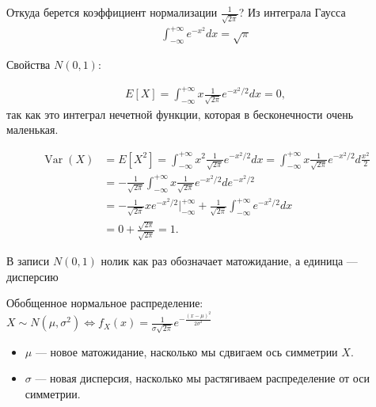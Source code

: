 \documentclass[12pt]{article}
\DeclareMathOperator{\Var}{Var}
\begin{document}
  Откуда берется коэффициент нормализации $\frac{1}{\sqrt{2\pi}}$? Из интеграла Гаусса
  \begin{align*}
    \int_{-\infty}^{+\infty} e^{-x^2} dx = \sqrt{\pi}
  \end{align*}

  Свойства $N(0, 1)$:

  \begin{align*}
    E[X] = \int_{-\infty}^{+\infty} x \frac{1}{\sqrt{2\pi}}e^{-x^2/2} dx = 0,
  \end{align*}
  так как это интеграл нечетной функции, которая в бесконечности очень маленькая.

  \begin{align*}
    \Var(X) &= E[X^2] = \int_{-\infty}^{+\infty} x^2 \frac{1}{\sqrt{2\pi}}e^{-x^2/2} dx = \int_{-\infty}^{+\infty} x \frac{1}{\sqrt{2\pi}}e^{-x^2/2}d\frac{x^2}{2} \\
            &= - \frac{1}{\sqrt{2\pi}} \int_{-\infty}^{+\infty} x \frac{1}{\sqrt{2\pi}}e^{-x^2/2}de^{-x^2/2} \\
            &= - \frac{1}{\sqrt{2\pi}} x e^{-x^2/2} \bigg|_{-\infty}^{+\infty} + \frac{1}{\sqrt{2\pi}} \int_{-\infty}^{+\infty} e^{-x^2/2} dx \\
            &= 0 + \frac{\sqrt{2\pi}}{\sqrt{2\pi}} = 1.
  \end{align*}

  В записи $N(0, 1)$ нолик как раз обозначает матожидание, а единица --- дисперсию

  Обобщенное нормальное распределение: $X \sim N(\mu, \sigma^2) \Leftrightarrow f_X(x) = \frac{1}{\sigma\sqrt{2\pi}}e^{-\frac{(x - \mu)^2}{2\sigma^2}}$

  \begin{itemize}
    \item $\mu$ --- новое матожидание, насколько мы сдвигаем ось симметрии $X$.
    \item $\sigma$ --- новая дисперсия, насколько мы растягиваем распределение от оси симметрии.
  \end{itemize}

  \begin{center}
  \end{center}
  
\end{document}
